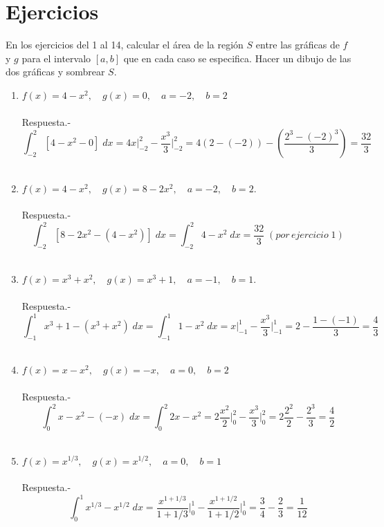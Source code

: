 \setcounter{section}{3}
\section{Ejercicios}

En los ejercicios del 1 al 14, calcular el área de la región $S$ entre las gráficas de $f$ y $g$ para el intervalo $[a,b]$ que en cada caso se especifica. Hacer un dibujo de las dos gráficas y sombrear $S$.\\

\begin{enumerate}[\bfseries 1.]

\item $f(x) = 4 - x^2, \quad g(x)=0, \quad a = -2, \quad b = 2$\\\\
    Respuesta.-\; $$\int_{-2}^2 [4-x^2 - 0] \; dx = 4x \bigg|_{-2}^2 -\dfrac{x^3}{3}\bigg|_{-2}^2 = 4(2-(-2)) - \left(\dfrac{2^3 - (-2)^3}{3}\right)  = \dfrac{32}{3}$$\\ 

\item $f(x) = 4 - x^2, \quad g(x) = 8 - 2x^2,\quad a = -2, \quad b = 2.$\\\\
    Respuesta.-\; $$\int_{-2}^2 [8 - 2x^2 - (4 - x^2)] \; dx = \int_{-2}^2 4-x^2 \; dx = \dfrac{32}{3} \; (por \, ejercicio \; 1)$$\\

\item $f(x)=x^3+x^2,\quad g(x)=x^3 + 1, \quad a=-1, \quad b=1$.\\\\
    Respuesta.-\; $$\int_{-1}^1 x^3 + 1 - (x^3 + x^2) \;dx = \int_{-1}^1 1-x^2\; dx = x\bigg|_{-1}^1 - \dfrac{x^3}{3}\bigg|_{-1}^1   = 2 - \dfrac{1-(-1)}{3} = \dfrac{4}{3}$$\\

\item $f(x)=x-x^2,\quad g(x)=-x,\quad a=0,\quad b=2$\\\\
    Respuesta.-\; $$\int_0^2 x-x^2 - (-x) \; dx = \int_0^2 2x - x^2 = 2\dfrac{x^2}{2}\bigg|_0^2 - \dfrac{x^3}{3}\bigg|_0^2 = 2\dfrac{2^2}{2} - \dfrac{2^3}{3} = \dfrac{4}{2}$$\\

\item $f(x) = x^{1/3}, \quad g(x) = x^{1/2}, \quad a=0, \quad b=1$\\\\ 
    Respuesta.-\; $$\int_0^1 x^{1/3} - x^{1/2} \; dx = \dfrac{x^{1+1/3}}{1+1/3}\bigg|_0^1 - \dfrac{x^{1+1/2}}{1+1/2}\bigg|_0^1 = \dfrac{3}{4} - \dfrac{2}{3} = \dfrac{1}{12}$$\\


\end{enumerate}
